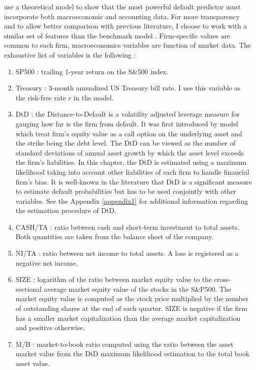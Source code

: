 \citet{leippold} use a theoretical model to show that the most powerful default predictor must incorporate both macroeconomic and accounting data. For more transparency and to allow better comparison with previous literature, I choose to work with a similar set of features than the benchmark model \citet{Duan2012}. Firm-specific values are common to each firm, macroeconomics variables are function of market data. The exhaustive list of variables is the following :
\begin{enumerate}
\item SP500 : trailing 1-year return on the S\&500 index. 
\item Treasury : 3-month annualized US Treasury bill rate. I use this variable as the risk-free rate $r$ in the model. 
\item DtD : the Distance-to-Default is a volatility adjusted leverage measure for gauging how far is the firm from default. It was first introduced by \citet{Merton1974} model which treat firm's equity value as a call option on the underlying asset and the strike being the debt level. The DtD can be viewed as the number of standard deviations of annual asset growth by which the asset level exceeds the firm's liabilities. In this chapter, the DtD is estimated using a maximum likelihood taking into account other liabilities of each firm to handle financial firm's bias. It is well-known in the literature that DtD is a significant measure to estimate default probabilities but has to be used conjointly with other variables. See the Appendix \ref{appendix1} for additional information regarding the estimation procedure of DtD.
\item CASH/TA : ratio between cash and short-term investment to total assets. Both quantities are taken from the balance sheet of the company.
\item NI/TA : ratio between net income to total assets. A loss is registered as a negative net income.
\item SIZE : logarithm of the ratio between market equity value to the cross-sectional average market equity value of the stocks in the S\&P500. The market equity value is computed as the stock price multiplied by the number of outstanding shares at the end of each quarter. SIZE is negative if the firm has a smaller market capitalization than the average market capitalization and positive otherwise.
\item M/B : market-to-book ratio computed using the ratio between the asset market value from the DtD maximum likelihood estimation to the total book asset value.
\end{enumerate}

